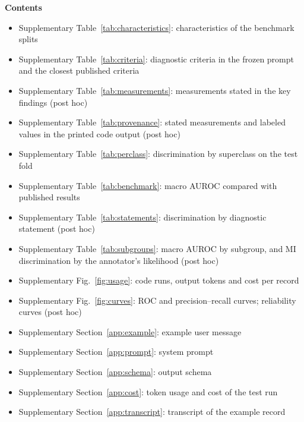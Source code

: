 \noindent\textbf{Contents}
{  %
\begin{itemize}\setlength{\itemsep}{0pt}
  \item Supplementary Table~\ref{tab:characteristics}: characteristics of the benchmark splits
  \item Supplementary Table~\ref{tab:criteria}: diagnostic criteria in the frozen prompt and the closest published
    criteria
  \item Supplementary Table~\ref{tab:measurements}: measurements stated in the key findings (post hoc)
  \item Supplementary Table~\ref{tab:provenance}: stated measurements and labeled values in the printed code output
    (post hoc)
  \item Supplementary Table~\ref{tab:perclass}: discrimination by superclass on the test fold
  \item Supplementary Table~\ref{tab:benchmark}: macro AUROC compared with published results
  \item Supplementary Table~\ref{tab:statements}: discrimination by diagnostic statement (post hoc)
  \item Supplementary Table~\ref{tab:subgroups}: macro AUROC by subgroup, and MI discrimination by the annotator's
    likelihood (post hoc)
  \item Supplementary Fig.~\ref{fig:usage}: code runs, output tokens and cost per record
  \item Supplementary Fig.~\ref{fig:curves}: ROC and precision--recall curves; reliability curves (post hoc)
  \item Supplementary Section~\ref{app:example}: example user message
  \item Supplementary Section~\ref{app:prompt}: system prompt
  \item Supplementary Section~\ref{app:schema}: output schema
  \item Supplementary Section~\ref{app:cost}: token usage and cost of the test run
  \item Supplementary Section~\ref{app:transcript}: transcript of the example record
\end{itemize}
\par}

